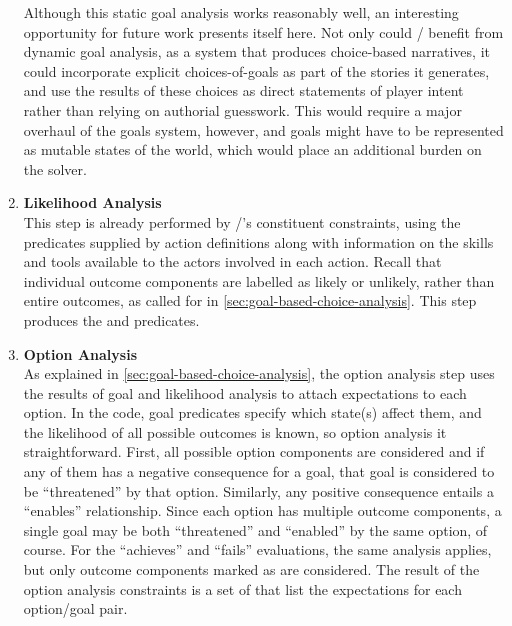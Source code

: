 \begin{enumerate}
    Although this static goal analysis works reasonably well, an interesting opportunity for future work presents itself here.
    Not only could \dunyazad/ benefit from dynamic goal analysis, as a system that produces choice-based narratives, it could incorporate explicit choices-of-goals as part of the stories it generates, and use the results of these choices as direct statements of player intent rather than relying on authorial guesswork.
    This would require a major overhaul of the goals system, however, and goals might have to be represented as mutable states of the world, which would place an additional burden on the solver.

  \item %
    \textbf{Likelihood Analysis} \\
    This step is already performed by \dunyazad/'s constituent constraints, using the  predicates supplied by action definitions along with information on the skills and tools available to the actors involved in each action. 
    Recall that individual outcome components are labelled as likely or unlikely, rather than entire outcomes, as called for in \cref{sec:goal-based-choice-analysis}.
    This step produces the  and  predicates.

  \item %
    \textbf{Option Analysis} \\
    As explained in \cref{sec:goal-based-choice-analysis}, the option analysis step uses the results of goal and likelihood analysis to attach expectations to each option.
    In the code, goal predicates specify which state(s) affect them, and the likelihood of all possible outcomes is known, so option analysis it straightforward.
    First, all possible option components are considered and if any of them has a negative consequence for a goal, that goal is considered to be ``threatened'' by that option.
    Similarly, any positive consequence entails a ``enables'' relationship.
    Since each option has multiple outcome components, a single goal may be both ``threatened'' and ``enabled'' by the same option, of course.
    For the ``achieves'' and ``fails'' evaluations, the same analysis applies, but only outcome components marked as  are considered.
    The result of the option analysis constraints is a set of  that list the expectations for each option/goal pair.


\end{enumerate}

